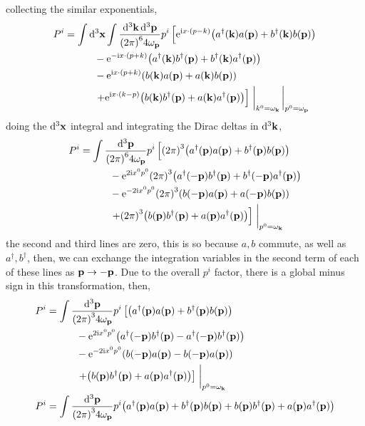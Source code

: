 collecting the similar exponentials,
\begin{align}
    P^i&=\int\dd[3]{\vb x}\int\frac{\dd[3]{\vb k}\dd[3]{\vb p}}{\qty(2\pi)^64\omega_{\vb p}}p^i\left[\e^{\im x\cdot\qty(p-k)}\qty(a^\dagger\qty(\vb k)a\qty(\vb p)+b^\dagger\qty(\vb k)b\qty(\vb p))\right.\nonumber\\
    &\quad\quad\quad-\e^{-\im x\cdot\qty(p+k)}\qty(a^\dagger\qty(\vb k)b^\dagger\qty(\vb p)+b^\dagger\qty(\vb k)a^\dagger\qty(\vb p))\nonumber\\
    &\quad\quad\quad-\e^{\im x\cdot\qty(p+k)}\qty(b\qty(\vb k)a\qty(\vb p)+a\qty(\vb k)b\qty(\vb p))\nonumber\\
    &\quad\quad\quad\left.+\e^{\im x\cdot\qty(k-p)}\qty(b\qty(\vb k)b^\dagger\qty(\vb p)+a\qty(\vb k)a^\dagger\qty(\vb p))\right]\eval_{k^0=\omega_{\vb k}}\eval_{p^0=\omega_{\vb p}}
\end{align}
doing the $\dd[3]{\vb x}$ integral and integrating the Dirac deltas in $\dd[3]{\vb k}$,
\begin{align}
    P^i&=\int\frac{\dd[3]{\vb p}}{\qty(2\pi)^64\omega_{\vb p}}p^i\left[\qty(2\pi)^3\qty(a^\dagger\qty(\vb p)a\qty(\vb p)+b^\dagger\qty(\vb p)b\qty(\vb p))\right.\nonumber\\
    &\quad\quad\quad-\e^{2\im x^0p^0}\qty(2\pi)^3\qty(a^\dagger\qty(-\vb p)b^\dagger\qty(\vb p)+b^\dagger\qty(-\vb p)a^\dagger\qty(\vb p))\nonumber\\
    &\quad\quad\quad-\e^{-2\im x^0p^0}\qty(2\pi)^3\qty(b\qty(-\vb p)a\qty(\vb p)+a\qty(-\vb p)b\qty(\vb p))\nonumber\\
    &\quad\quad\quad\left.+\qty(2\pi)^3\qty(b\qty(\vb p)b^\dagger\qty(\vb p)+a\qty(\vb p)a^\dagger\qty(\vb p))\right]\eval_{p^0=\omega_{\vb k}}
\end{align}
the second and third lines are zero, this is so because $a,b$ commute, as well as $a^\dagger,b^\dagger$, then, we can exchange the integration variables in the second term of each of these lines as $\vb p\rightarrow -\vb p$. 
Due to the overall $p^i$ factor, there is a global minus sign in this transformation, then,
\begin{align}
    P^i&=\int\frac{\dd[3]{\vb p}}{\qty(2\pi)^34\omega_{\vb p}}p^i\left[\qty(a^\dagger\qty(\vb p)a\qty(\vb p)+b^\dagger\qty(\vb p)b\qty(\vb p))\right.\nonumber\\
    &\quad\quad\quad-\e^{2\im x^0p^0}\qty(a^\dagger\qty(-\vb p)b^\dagger\qty(\vb p)-a^\dagger\qty(-\vb p)b^\dagger\qty(\vb p))\nonumber\\
    &\quad\quad\quad-\e^{-2\im x^0p^0}\qty(b\qty(-\vb p)a\qty(\vb p)-b\qty(-\vb p)a\qty(\vb p))\nonumber\\
    &\quad\quad\quad\left.+\qty(b\qty(\vb p)b^\dagger\qty(\vb p)+a\qty(\vb p)a^\dagger\qty(\vb p))\right]\eval_{p^0=\omega_{\vb k}}\\
    P^i&=\int\frac{\dd[3]{\vb p}}{\qty(2\pi)^34\omega_{\vb p}}p^i\qty(a^\dagger\qty(\vb p)a\qty(\vb p)+b^\dagger\qty(\vb p)b\qty(\vb p)+b\qty(\vb p)b^\dagger\qty(\vb p)+a\qty(\vb p)a^\dagger\qty(\vb p))
\end{align}
